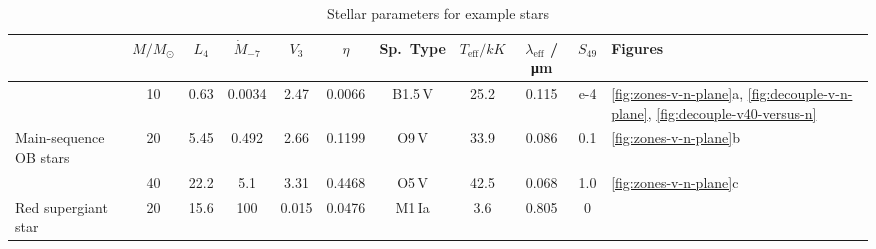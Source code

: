 \begin{table}
  \centering
  \caption{Stellar parameters for example stars}
  \label{tab:stars}
  \begin{tabular}{l S S S S S S S S S l}
    \toprule
    & {\(M / \si{M_\odot}\)} & {\(L_4\)}
    & {\(\dot{M}_{-7}\)} & {\(V_3\)} & {\( \eta \)}
    & {Sp.~Type} 
    & {\(T_{\text{eff}} / \si{kK}\)} & {\(\lambda_{\text{eff}}\) / \si{\um}}
    & {\(S_{49}\)} & Figures 
    \\
    \midrule
    & 10 & 0.63 & 0.0034 & 2.47 & 0.0066 & {B1.5\,V} & 25.2 & 0.115 & e-4
                   & \ref{fig:zones-v-n-plane}a,
                     \ref{fig:decouple-v-n-plane},
                     \ref{fig:decouple-v40-versus-n} \\
    Main-sequence OB stars
    & 20 & 5.45 & 0.492 & 2.66 & 0.1199 & {O9\,V} & 33.9 & 0.086 & 0.1
                   & \ref{fig:zones-v-n-plane}b\\
    & 40 & 22.2 & 5.1 & 3.31 & 0.4468 & {O5\,V} & 42.5 & 0.068 & 1.0
                   & \ref{fig:zones-v-n-plane}c\\[\smallskipamount]
    Red supergiant star
    & 20 & 15.6 & 100 & 0.015 & 0.0476 & {M1\,Ia} & 3.6 & 0.805 & 0
                   & \\ 
    \bottomrule
  \end{tabular}
\end{table}

